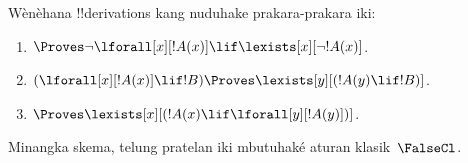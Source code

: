\documentclass[../../../include/open-logic-section]{subfiles}
\begin{document}
\begin{prob}
Wènèhana !!{derivation}s kang nuduhake prakara-prakara iki:
\begin{enumerate}
\item $\Proves \lnot\lforall[x][!A(x)] \lif \lexists[x][\lnot!A(x)]$.
\item $(\lforall[x][!A(x)] \lif !B) \Proves \lexists[y][(!A(y) \lif !B)]$.
\item $\Proves \lexists[x][(!A(x) \lif \lforall[y][!A(y)])]$.
\end{enumerate}
Minangka skema, telung pratelan iki mbutuhaké aturan klasik~$\FalseCl$.
\end{prob}
\end{document}
